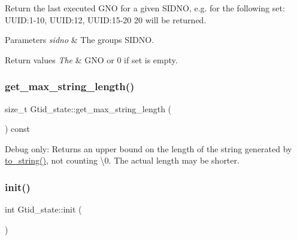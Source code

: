 Return the last executed G\+NO for a given S\+I\+D\+NO, e.\+g. for the following set\+: U\+U\+ID\+:1-\/10, U\+U\+ID\+:12, U\+U\+ID\+:15-\/20 20 will be returned.


\begin{DoxyParams}{Parameters}
{\em sidno} & The group\textquotesingle{}s S\+I\+D\+NO.\\
\hline
\end{DoxyParams}

\begin{DoxyRetVals}{Return values}
{\em The} & G\+NO or 0 if set is empty. \\
\hline
\end{DoxyRetVals}
\mbox{\label{classGtid__state_ad19fcbc6a9a1f112c4452d170ac28e05}} 
\subsubsection{\texorpdfstring{get\+\_\+max\+\_\+string\+\_\+length()}{get\_max\_string\_length()}}
{\footnotesize\ttfamily size\+\_\+t Gtid\+\_\+state\+::get\+\_\+max\+\_\+string\+\_\+length (\begin{DoxyParamCaption}{ }\end{DoxyParamCaption}) const\hspace{0.3cm}{\ttfamily [inline]}}

Debug only\+: Returns an upper bound on the length of the string generated by \mbox{\hyperlink{classGtid__state_aa80c0cb53ce52933aa88ffcfb7601a0b}{to\+\_\+string()}}, not counting \textquotesingle{}\textbackslash{}0\textquotesingle{}. The actual length may be shorter. \mbox{\label{classGtid__state_a05bbafc9331c90395789157153fd3601}} 
\subsubsection{\texorpdfstring{init()}{init()}}
{\footnotesize\ttfamily int Gtid\+\_\+state\+::init (\begin{DoxyParamCaption}{ }\end{DoxyParamCaption})}

